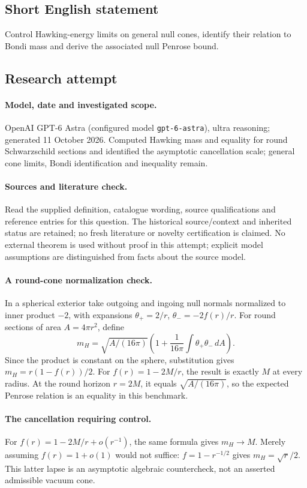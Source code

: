 \documentclass[11pt]{article}
\begin{document}
\subsection{Short English statement}
Control Hawking-energy limits on general null cones, identify their relation to Bondi mass and derive the associated null Penrose bound.
\subsection{Research attempt}
\paragraph{Model, date and investigated scope.}
OpenAI GPT-6 Astra (configured model \texttt{gpt-6-astra}), ultra reasoning; generated 11 October 2026. Computed Hawking mass and equality for round Schwarzschild sections and identified the asymptotic cancellation scale; general cone limits, Bondi identification and inequality remain.

\paragraph{Sources and literature check.}
Read the supplied definition, catalogue wording, source qualifications and reference entries for this question. The historical source/context and inherited status are retained; no fresh literature or novelty certification is claimed. No external theorem is used without proof in this attempt; explicit model assumptions are distinguished from facts about the source model.

\paragraph{A round-cone normalization check.} In a spherical exterior take outgoing and ingoing null normals normalized to inner product \(-2\), with expansions \(\theta_+=2/r\), \(\theta_-=-2f(r)/r\). For round sections of area \(A=4\pi r^2\), define
\[
 m_H=\sqrt{A/(16\pi)}\left(1+\frac1{16\pi}\int\theta_+\theta_-\,dA\right).
\]
Since the product is constant on the sphere, substitution gives \(m_H=r(1-f(r))/2\). For \(f(r)=1-2M/r\), the result is exactly \(M\) at every radius. At the round horizon \(r=2M\), it equals \(\sqrt{A/(16\pi)}\), so the expected Penrose relation is an equality in this benchmark.
\paragraph{The cancellation requiring control.} For \(f(r)=1-2M/r+o(r^{-1})\), the same formula gives \(m_H\to M\). Merely assuming \(f(r)=1+o(1)\) would not suffice: \(f=1-r^{-1/2}\) gives \(m_H=\sqrt r/2\). This latter lapse is an asymptotic algebraic countercheck, not an asserted admissible vacuum cone.
\end{document}
